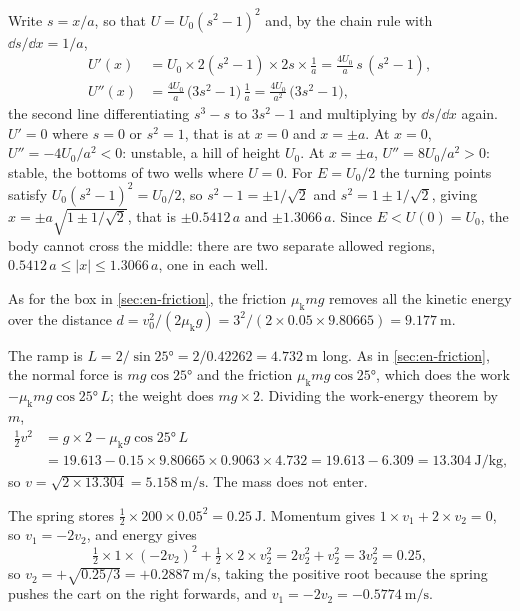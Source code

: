 Write $s = x/a$, so that $U = U_0(s^2 - 1)^2$
and, by the chain rule with $\dd s/\dd x = 1/a$,
\begin{align*}
   U'(x) &= U_0\times2(s^2 - 1)\times2s\times\frac1a
   = \frac{4U_0}{a}\,s\,(s^2 - 1) ,\\
   U''(x) &= \frac{4U_0}{a}\,\bigl(3s^2 - 1\bigr)\,\frac1a
   = \frac{4U_0}{a^2}\,\bigl(3s^2 - 1\bigr) ,
\end{align*}
the second line differentiating $s^3 - s$ to $3s^2 - 1$ and multiplying
by $\dd s/\dd x$ again. $U' = 0$ where $s = 0$ or $s^2 = 1$, that is at $x
= 0$ and $x = \pm a$. At $x = 0$, $U'' = -4U_0/a^2 < 0$: unstable, a
hill of height $U_0$. At $x = \pm a$, $U'' = 8U_0/a^2 > 0$: stable, the
bottoms of two wells where $U = 0$. For $E = U_0/2$ the turning points
satisfy $U_0(s^2 - 1)^2 = U_0/2$, so $s^2 - 1 = \pm1/\sqrt2$ and $s^2 =
1 \pm 1/\sqrt2$, giving $x = \pm a\sqrt{1 \pm 1/\sqrt2}$, that is $\pm
0.5412\,a$ and $\pm1.3066\,a$. Since $E < U(0) = U_0$, the body cannot
cross the middle: there are two separate allowed regions, $0.5412\,a \le
\lvert x\rvert \le 1.3066\,a$, one in each well.

As for the box in \cref{sec:en-friction}, the
friction $\mu_{\mathrm{k}}mg$ removes all the kinetic energy over the
distance $d = v_0^2/(2\mu_{\mathrm{k}}g) = 3^2/(2\times0.05\times
9.80665) = \SI{9.177}{\metre}$.

The ramp is $L = 2/\sin\ang{25} = 2/0.42262 =
\SI{4.732}{\metre}$ long. As in \cref{sec:en-friction}, the normal force
is $mg\cos\ang{25}$ and the friction $\mu_{\mathrm{k}}mg\cos\ang{25}$,
which does the work $-\mu_{\mathrm{k}}mg\cos\ang{25}\,L$; the weight does
$mg\times2$. Dividing the work-energy theorem by $m$,
\begin{align*}
   \tfrac12 v^2 &= g\times2 - \mu_{\mathrm{k}}g\cos\ang{25}\,L\\
   &= 19.613 - 0.15\times9.80665\times0.9063\times4.732
   = 19.613 - 6.309 = \SI{13.304}{\joule\per\kilogram} ,
\end{align*}
so $v = \sqrt{2\times13.304} = \SI{5.158}{\metre\per\second}$. The mass
does not enter.

The spring stores $\frac12\times200\times0.05^2 =
\SI{0.25}{\joule}$. Momentum gives $1\times v_1 + 2\times v_2 = 0$, so
$v_1 = -2v_2$, and energy gives
\begin{equation*}
   \tfrac12\times1\times(-2v_2)^2 + \tfrac12\times2\times v_2^2
   = 2v_2^2 + v_2^2 = 3v_2^2 = 0.25 ,
\end{equation*}
so $v_2 = +\sqrt{0.25/3} = +\SI{0.2887}{\metre\per\second}$, taking the
positive root because the spring pushes the cart on the right forwards,
and $v_1 = -2v_2 = -\SI{0.5774}{\metre\per\second}$.

